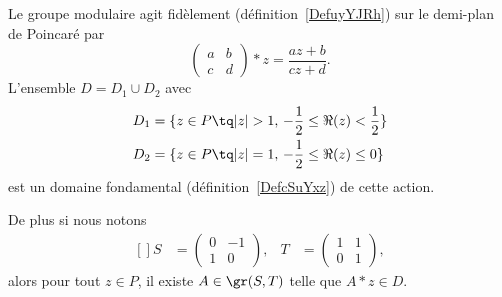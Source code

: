 \begin{theorem} \label{ThoItqXCm}
	Le groupe modulaire agit fidèlement (définition~\ref{DefuyYJRh}) sur le demi-plan de Poincaré par
	\begin{equation}    \label{EqVXvwlB}
		\begin{pmatrix}
			a & b \\
			c & d
		\end{pmatrix}*z=\frac{ az+b }{ cz+d }.
	\end{equation}
	L'ensemble \(D= D_1\cup D_2\) avec
	\begin{subequations}
		\begin{align}
			D_1 & =\{ z\in P\tq | z |>1,\,-\frac{ 1 }{2}\leq \Re(z)<\frac{ 1 }{2} \} \\
			D_2 & =\{ z\in P\tq | z |=1,\,-\frac{ 1 }{2}\leq \Re(z)\leq0 \}
		\end{align}
	\end{subequations}
	est un domaine fondamental (définition~\ref{DefcSuYxz}) de cette action.

	De plus si nous notons
	\begin{equation}
		\begin{aligned}[]
			S & =\begin{pmatrix}
				0 & -1 \\
				1 & 0
			\end{pmatrix}, & T & =\begin{pmatrix}
				1 & 1 \\
				0 & 1
			\end{pmatrix},
		\end{aligned}
	\end{equation}
	alors pour tout \( z\in P\), il existe \( A\in \gr(S,T)\) telle que \( A*z\in D\).
\end{theorem}

